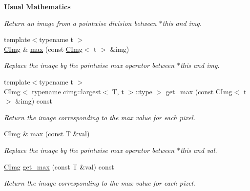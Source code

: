 \begin{Indent}{\bf Usual Mathematics}
\begin{DoxyCompactItemize}
\begin{DoxyCompactList}\small\item\em Return an image from a pointwise division between {\ttfamily $\ast$this} and {\ttfamily img}. \item\end{DoxyCompactList}\item 
{\footnotesize template$<$typename t $>$ }\\\hyperlink{structcimg__library_1_1_c_img}{CImg} \& \hyperlink{structcimg__library_1_1_c_img_a14fac7e85c0ace918e9f8758c35ab5df}{max} (const \hyperlink{structcimg__library_1_1_c_img}{CImg}$<$ t $>$ \&img)
\begin{DoxyCompactList}\small\item\em Replace the image by the pointwise max operator between {\ttfamily $\ast$this} and {\ttfamily img}. \item\end{DoxyCompactList}\item 
{\footnotesize template$<$typename t $>$ }\\\hyperlink{structcimg__library_1_1_c_img}{CImg}$<$ typename \hyperlink{structcimg__library_1_1cimg_1_1largest}{cimg::largest}$<$ T, t $>$::type $>$ \hyperlink{structcimg__library_1_1_c_img_ab1cdfd82e94aadb1f5181d5c0e035149}{get\_\-max} (const \hyperlink{structcimg__library_1_1_c_img}{CImg}$<$ t $>$ \&img) const 
\begin{DoxyCompactList}\small\item\em Return the image corresponding to the max value for each pixel. \item\end{DoxyCompactList}\item 
\hyperlink{structcimg__library_1_1_c_img}{CImg} \& \hyperlink{structcimg__library_1_1_c_img_a9f9c6b0a3ae1299b44f411aa212adf2a}{max} (const T \&val)
\begin{DoxyCompactList}\small\item\em Replace the image by the pointwise max operator between {\ttfamily $\ast$this} and {\ttfamily val}. \item\end{DoxyCompactList}\item 
\hyperlink{structcimg__library_1_1_c_img}{CImg} \hyperlink{structcimg__library_1_1_c_img_a1e79da4f5e9530ab639d8991ac264c8e}{get\_\-max} (const T \&val) const 
\begin{DoxyCompactList}\small\item\em Return the image corresponding to the max value for each pixel. \item\end{DoxyCompactList}\item 

\end{DoxyCompactItemize}
\end{Indent}
